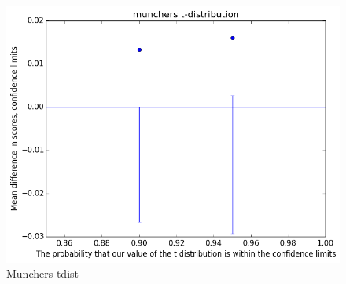 			\begin{figure}[h] 
				\centering 
				\includegraphics[width=\textwidth]{munchers_tdist.png} 
				\caption{Munchers tdist}
			\end{figure}

